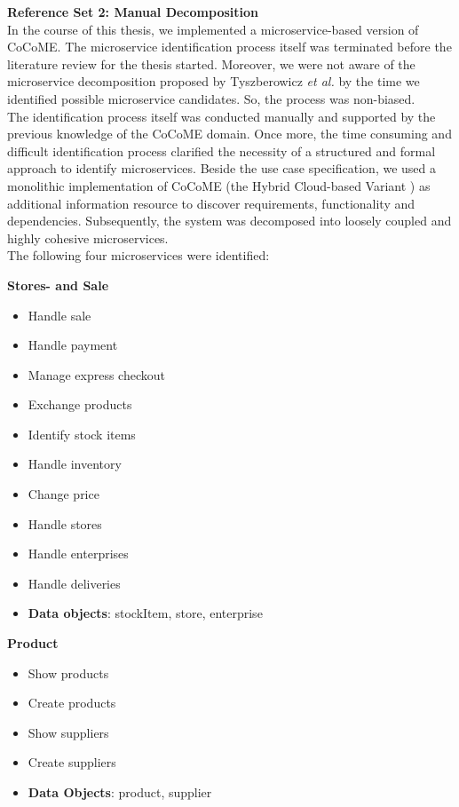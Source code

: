 \noindent
\textbf{Reference Set 2: Manual Decomposition} \\
In the course of this thesis, we implemented a microservice-based version of CoCoME. The microservice identification process itself was terminated before the literature review for the thesis started. Moreover, we were not aware of the microservice decomposition proposed by Tyszberowicz \textit{et al.} \cite{FunctionalDecompositionHeinrich} by the time we identified possible microservice candidates. So, the process was non-biased. \\
The identification process itself was conducted manually and supported by the previous knowledge of the CoCoME domain. Once more, the time consuming and difficult identification process clarified the necessity of a structured and formal approach to identify microservices. Beside the use case specification, we used a monolithic implementation of CoCoME (the Hybrid Cloud-based Variant \cite{CoCoMETechnical}) as additional information resource to discover requirements, functionality and dependencies. Subsequently, the system was decomposed into loosely coupled and highly cohesive microservices. \\
The following four microservices were identified:




\begin{multicols}{2}
	\textbf{Stores- and Sale}
	\begin{flushleft}
		\begin{itemize}[noitemsep]
			\item Handle sale
			\item Handle payment
			\item Manage express checkout
			\item Exchange products
			\item Identify stock items
			\item Handle inventory
			\item Change price
			\item Handle stores
			\item Handle enterprises
			\item Handle deliveries
			\item \textbf{Data objects}: stockItem, store, enterprise
		\end{itemize}
	\end{flushleft}
	
	
	\vfill
	\columnbreak
	\textbf{Product}
	\begin{flushleft}
		\begin{itemize}[noitemsep]
			\item Show products
			\item Create products
			\item Show suppliers
			\item Create suppliers
			\item \textbf{Data Objects}: product, supplier
		
		
		\end{itemize}
	\end{flushleft}

\end{multicols}




